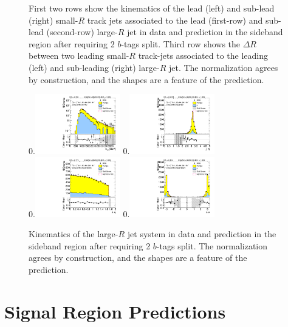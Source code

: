 \begin{figure}[htbp!]
\begin{center}
  \caption{First two rows show the kinematics of the lead (left) and sub-lead (right) small-$R$ track jets associated to the lead (first-row) and sub-lead (second-row) large-$R$ jet in data and prediction in the sideband region after requiring 2 $b$-tags split. Third row shows the $\Delta R$ between two leading small-$R$ track-jets associated to the leading (left) and sub-leading (right) large-$R$ jet. The normalization agrees by construction, and the shapes are a feature of the prediction. }
  \label{fig:boosted-2bs-control-ak2}
\end{center}
\end{figure}


\begin{figure}[htbp!]
\begin{center}
0.\includegraphics[width=0.33\textwidth, angle=270]{./figures/boosted/Control/Moriond_TwoTag_split_Control_mHH_l_1.pdf}
0.\includegraphics[width=0.33\textwidth, angle=270]{./figures/boosted/Control/Moriond_TwoTag_split_Control_hCandDr.pdf}\\
0.\includegraphics[width=0.33\textwidth, angle=270]{./figures/boosted/Control/Moriond_TwoTag_split_Control_hCandDeta.pdf}
0.\includegraphics[width=0.33\textwidth, angle=270]{./figures/boosted/Control/Moriond_TwoTag_split_Control_hCandDphi.pdf}
  \caption{Kinematics of the large-$R$ jet system in data and prediction in the sideband region after requiring 2 $b$-tags split. The normalization agrees by construction, and the shapes are a feature of the prediction. }
  \label{fig:boosted-2bs-control-ak10-system}
\end{center}
\end{figure}




\section{Signal Region Predictions}

